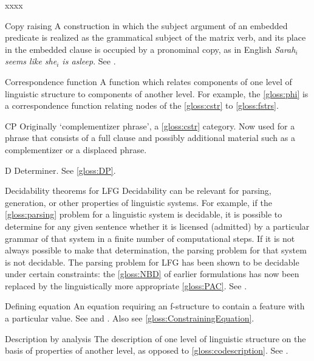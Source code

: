 \documentclass[output=paper,colorlinks,citecolor=brown]{langscibook}
\begin{document}
\begin{labeling}{xxxx}
\item[Copy raising] A construction in which the subject argument of an embedded predicate is realized as the grammatical subject of the matrix verb, and its place in the embedded clause is occupied by a pronominal copy, as in English \emph{Sarah$_i$ seems like she$_i$ is asleep}. See .
  
\item[Correspondence function] A function which relates components of one level of linguistic structure to components of another level. For example, the \ref{gloss:phi} is a correspondence function relating nodes of the \ref{gloss:cstr} to \ref{gloss:fstrs}.

\item[CP\namedlabel{gloss:CP}{CP}] Originally `complementizer phrase', a \ref{gloss:cstr} category.  Now used for a phrase that consists of a full clause and possibly additional material such as a complementizer or a displaced phrase.

\item[D] Determiner. See \ref{gloss:DP}.

\item[Decidability theorems for LFG\namedlabel{gloss:decidability}{decidability}] Decidability can be relevant for parsing, generation, or other properties of linguistic systems.  For example, if the \ref{gloss:parsing} problem for a linguistic system is decidable, it is possible to determine for any given sentence whether it is licensed (admitted) by a particular grammar of that system in a finite number of computational steps. If it is not always possible to make that determination, the parsing problem for that system is not decidable.  The parsing problem for LFG has been shown to be decidable under certain constraints: the \ref{gloss:NBD} of earlier formulations has now been replaced by the linguistically more appropriate \ref{gloss:PAC}. See .

\item[Defining equation\namedlabel{gloss:DefiningEquation}{Defining Equation}\namedlabel{gloss:definingequations}{defining equations}] An equation requiring an f-structure to contain a feature with a particular value.  See \citetv[\ref{sect:intro:definingequations}]{chapters/Intro} and \citetv[\ref{sec:CoreConcepts:Defining}]{chapters/CoreConcepts}.  Also see \ref{gloss:ConstrainingEquation}.

\item[Description by analysis\namedlabel{gloss:descrbyanalysis}{description by analysis}] The description of one level of linguistic structure on the basis of properties of another level, as opposed to \ref{gloss:codescription}. See \citetv[\ref{sect:intro:addlevels}]{chapters/Intro}.


\end{labeling}
\end{document}
